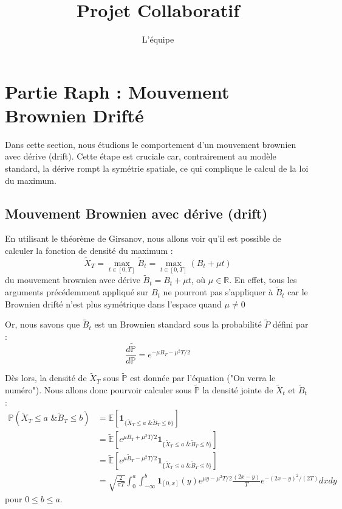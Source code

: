 \documentclass[11pt]{article}
\title{Projet Collaboratif}
\author{L'équipe}
\begin{document}
\maketitle

\section{Partie Raph : Mouvement Brownien Drifté}

Dans cette section, nous étudions le comportement d'un mouvement brownien avec dérive (drift). Cette étape est cruciale car, contrairement au modèle standard, la dérive rompt la symétrie spatiale, ce qui complique le calcul de la loi du maximum.
\subsection{Mouvement Brownien avec dérive (drift)}

En utilisant le théorème de Girsanov, nous allons voir qu'il est possible de calculer la fonction de densité du maximum :
\begin{equation}
    \tilde{X}_T = \max_{t\in[0,T]} \tilde{B}_t = \max_{t\in[0,T]} (B_t + \mu t)
\end{equation}
du mouvement brownien avec dérive $\tilde{B}_t = B_t + \mu t$, où $\mu \in \mathbb{R}$. En effet, tous les arguments précédemment appliqué sur ${B}_t$ ne pourront pas s'appliquer à $\tilde{B}_t$ car le Brownien drifté n'est plus symétrique dans l'espace quand $\mu \neq 0$

Or, nous savons que $\tilde{B}_t$ est un Brownien standard sous la probabilité $\tilde{P}$ défini par :
\begin{equation}
    \frac{d\tilde{\mathbb{P}}}{d\mathbb{P}} = e^{-\mu B_T - \mu^2 T / 2}
\end{equation}

Dès lors, la densité de $\tilde{X}_T$ sous $\tilde{\mathbb{P}}$ est donnée par l'équation ("On verra le numéro"). Nous allons donc pourvoir calculer sous $\tilde{\mathbb{P}}$ la densité jointe de $\tilde{X}_t$ et $\tilde{B}_t$ :
\begin{align*}
    \mathbb{P}(\tilde{X}_T \le a \text{ \& } \tilde{B}_T \le b) &= \mathbb{E} \left[ \mathbf{1}_{\{\tilde{X}_T \le a \text{ \& } \tilde{B}_T \le b\}} \right] \\
    &= \tilde{\mathbb{E}} \left[ e^{\mu B_T + \mu^2 T / 2} \mathbf{1}_{\{\tilde{X}_T \le a \text{ \& } \tilde{B}_T \le b\}} \right] \\
    &= \tilde{\mathbb{E}} \left[ e^{\mu \tilde{B}_T - \mu^2 T / 2} \mathbf{1}_{\{\tilde{X}_T \le a \text{ \& } \tilde{B}_T \le b\}} \right] \\
    &= \sqrt{\frac{2}{\pi T}} \int_0^a \int_{-\infty}^b \mathbf{1}_{[0,x]}(y) e^{\mu y - \mu^2 T / 2} \frac{(2x - y)}{T} e^{-(2x - y)^2 / (2T)} dx dy
\end{align*} pour $0 \le b \le a$.
\end{document}
